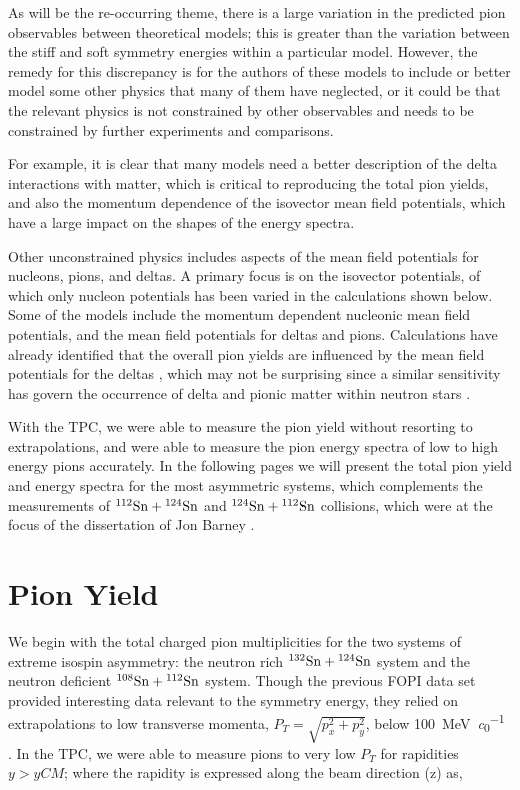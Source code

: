 As will be the re-occurring theme, there is a large variation in the predicted pion observables between theoretical models; this is greater than the variation between the stiff and soft symmetry energies within a particular model. However, the remedy for this discrepancy is for the authors of these models to include or better model some other physics that many of them have neglected, or it could be that the relevant physics is not constrained by other observables and needs to be constrained by further experiments and comparisons.

For example, it is clear that many models need a  better description of the delta interactions with matter, which is critical to reproducing the total pion yields, and also the momentum dependence of the isovector mean field potentials, which have a large impact on the shapes of the energy spectra. 

Other unconstrained physics includes aspects of the mean field potentials for nucleons, pions, and deltas. A primary focus is on the isovector potentials, of which only nucleon potentials has been varied in the calculations shown below. Some of the models include the momentum dependent nucleonic mean field potentials, and the mean field potentials for deltas and pions. Calculations have already identified that the overall pion yields are influenced by the mean field potentials for the deltas \cite{cozmaPC}, which may not be surprising since a similar sensitivity has govern the occurrence of delta and pionic matter within neutron stars \cite{deltaNS,pionNS}.  

With the \spirit TPC, we were able to measure the pion yield without resorting to extrapolations, and were able to measure the pion energy spectra of low to high energy pions accurately. In the following pages we will present the total pion yield and energy spectra for the most asymmetric systems, which complements the measurements of ${}^{112}\mathrm{Sn} + {}^{124}\mathrm{Sn}$ and ${}^{124}\mathrm{Sn} + {}^{112}\mathrm{Sn}$ collisions, which were at the focus of the dissertation of Jon Barney \cite{jon}.


\section{Pion Yield}

We begin with the total charged pion multiplicities for the two systems of extreme isospin asymmetry: the neutron rich ${}^{132}\mathrm{Sn} + {}^{124}\mathrm{Sn}$ system and the neutron deficient  ${}^{108}\mathrm{Sn} + {}^{112}\mathrm{Sn}$ system. Though the previous FOPI data set provided interesting data relevant to  the symmetry energy, they relied on extrapolations to low transverse momenta, $P_T = \sqrt{p_x^2 + p_y^2}$, below \SI{100}{\mega\electronvolt\per\clight} \cite{fopi}. In the \spirit TPC, we were able to measure pions to very low $P_T$ for rapidities $y > y{CM}$; where the rapidity is expressed along the beam direction (z) as,

